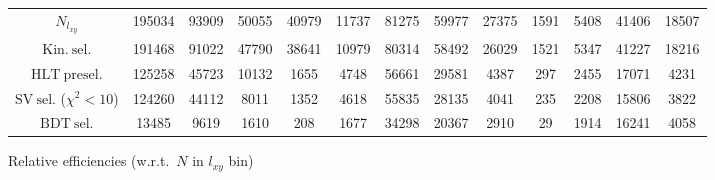 \documentclass[10pt,a4paper]{article}
\begin{document}
\begin{landscape}
{\begin{tabular}{c|cccc|cccc|cccc}
\midrule
$N_{l_{xy}}$ & 195034 & 93909 & 50055 & 40979 & 11737 & 81275 & 59977 & 27375 & 1591 & 5408 & 41406 & 18507\\
$\mathrm{Kin.\ sel.}$ & 191468 & 91022 & 47790 & 38641 & 10979 & 80314 & 58492 & 26029 & 1521 & 5347 & 41227 & 18216\\
$\mathrm{HLT\ presel.}$ & 125258 & 45723 & 10132 & 1655 & 4748 & 56661 & 29581 & 4387 & 297 & 2455 & 17071 & 4231\\
$\mathrm{SV\ sel.}$ ($\chi^2{<}10$) & 124260 & 44112 & 8011 & 1352 & 4618 & 55835 & 28135 & 4041 & 235 & 2208 & 15806 & 3822\\
$\mathrm{BDT\ sel.}$ & 13485 & 9619 & 1610 & 208 & 1677 & 34298 & 20367 & 2910 & 29 & 1914 & 16241 & 4058\\
\bottomrule
\end{tabular}}

\vspace{18pt}

Relative efficiencies (w.r.t.\ $N$ in $l_{xy}$ bin)


\end{landscape}
\end{document}

